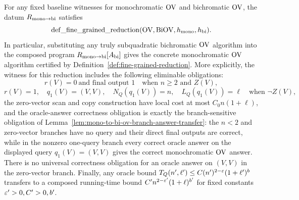 \begin{lemma}
  \label{lem:mono-to-bi-ov-fine-grained-reduction}
  For any fixed baseline witnesses for monochromatic $\mathrm{OV}$ and bichromatic
  $\mathrm{OV}$, the datum $R_{\rm mono\to bi}$ satisfies
  \[
    \operatorname{def\_fine\_grained\_reduction}
      (\mathrm{OV},\operatorname{BiOV},h_{\rm mono},h_{\rm bi}).
  \]
  In particular, substituting any truly subquadratic bichromatic $\mathrm{OV}$
  algorithm into the composed program
  $R_{\rm mono\to bi}[A_{\rm bi}]$ gives the concrete monochromatic $\mathrm{OV}$
  algorithm certified by Definition~\ref{def:fine-grained-reduction}.  More
  explicitly, the witness for this reduction includes the following eliminable
  obligations:
  \[
    r(V)=0\ \text{and final output }1\quad\text{when }n\geq2\text{ and }Z(V),
  \]
  \[
    r(V)=1,\quad q_1(V)=(V,V),\quad
    N_Q(q_1(V))=n,\quad L_Q(q_1(V))=\ell
    \quad\text{when }\neg Z(V),
  \]
  the zero-vector scan and copy construction have local cost at most
  $C_0n(1+\ell)$, and the oracle-answer correctness obligation is exactly the
  branch-sensitive obligation of
  Lemma~\ref{lem:mono-to-bi-ov-branch-answer-transfer}: the $n<2$ and
  zero-vector branches have no query and their direct final outputs are
  correct, while in the nonzero one-query branch every correct oracle answer
  on the displayed query $q_1(V)=(V,V)$ gives the correct monochromatic
  $\mathrm{OV}$ answer.  There is no universal correctness obligation for an oracle
  answer on $(V,V)$ in the zero-vector branch.  Finally, any oracle bound
  $T_Q(n',\ell')\leq C(n')^{2-\varepsilon}(1+\ell')^b$ transfers to a composed
  running-time bound
  $C'n^{2-\varepsilon'}(1+\ell)^{b'}$ for fixed constants
  $\varepsilon'>0,C'>0,b'$.
\end{lemma}
